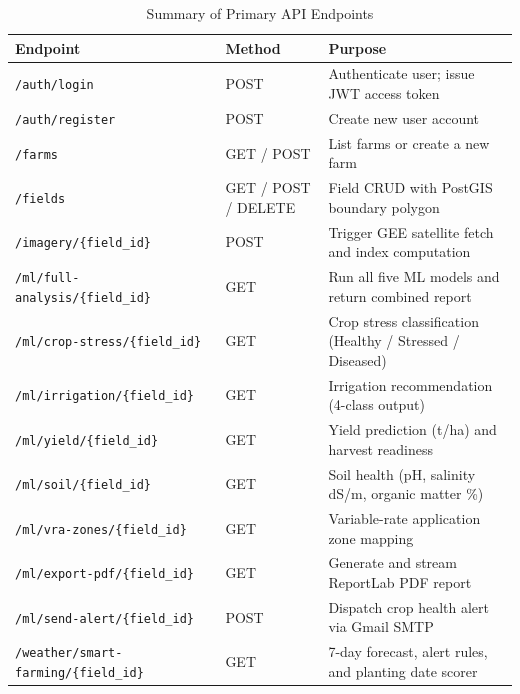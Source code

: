 \documentclass[conference]{IEEEtran}
\begin{document}
\begin{table}[t]
  \caption{Summary of Primary API Endpoints}
  \label{tab:api}
  \centering
  \footnotesize
  \renewcommand{\arraystretch}{1.15}
  \begin{tabular}{p{6.2cm} p{2.4cm} p{7.8cm}}
    \toprule
    \textbf{Endpoint} & \textbf{Method} & \textbf{Purpose} \\
    \midrule
    \texttt{/auth/login}                        & POST            & Authenticate user; issue JWT access token \\
    \texttt{/auth/register}                     & POST            & Create new user account \\
    \texttt{/farms}                             & GET / POST      & List farms or create a new farm \\
    \texttt{/fields}                            & GET / POST / DELETE & Field CRUD with PostGIS boundary polygon \\
    \texttt{/imagery/\{field\_id\}}              & POST            & Trigger GEE satellite fetch and index computation \\
    \texttt{/ml/full-analysis/\{field\_id\}}     & GET             & Run all five ML models and return combined report \\
    \texttt{/ml/crop-stress/\{field\_id\}}       & GET             & Crop stress classification (Healthy / Stressed / Diseased) \\
    \texttt{/ml/irrigation/\{field\_id\}}        & GET             & Irrigation recommendation (4-class output) \\
    \texttt{/ml/yield/\{field\_id\}}             & GET             & Yield prediction (t/ha) and harvest readiness \\
    \texttt{/ml/soil/\{field\_id\}}              & GET             & Soil health (pH, salinity dS/m, organic matter \%) \\
    \texttt{/ml/vra-zones/\{field\_id\}}         & GET             & Variable-rate application zone mapping \\
    \texttt{/ml/export-pdf/\{field\_id\}}        & GET             & Generate and stream ReportLab PDF report \\
    \texttt{/ml/send-alert/\{field\_id\}}        & POST            & Dispatch crop health alert via Gmail SMTP \\
    \texttt{/weather/smart-farming/\{field\_id\}} & GET            & 7-day forecast, alert rules, and planting date scorer \\
    \bottomrule
  \end{tabular}
\end{table}
\end{document}
